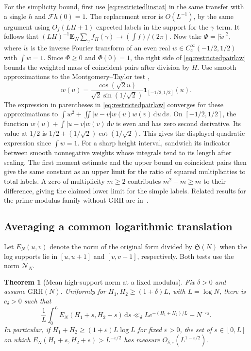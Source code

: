 \documentclass[11pt,a4paper]{article}
\numberwithin{equation}{section}
\newtheorem{theorem}{Theorem}[section]
\newcommand{\SSS}{\mathfrak S}
\newcommand{\grh}{\mathrm{GRH}}
\newcommand{\ud}{\mathrm d}
\newcommand{\NN}{\mathcal N_N}
\begin{document}
For the simplicity bound, first use \cref{eq:restrictedlinstat}
in the same transfer with a single $h$ and $\mathcal Fh(0)=1$.
The replacement error is $O(L^{-1})$, by the same argument
using $O_f(LH+1)$ expected labels in the support for the
$\gamma$ term. It follows that
$(LH)^{-1}\mathbf E_N\sum_\gamma f_H(\gamma)\to(\int f)/(2\pi)$.
Now take $\Phi=|\check w|^2$, where $\check w$ is the inverse
Fourier transform of an even real $w\in C_c^\infty(-1/2,1/2)$
with $\int w=1$. Since $\Phi\ge0$ and $\Phi(0)=1$, the right
side of \cref{eq:restrictedpairlaw} bounds the weighted mass
of coincident pairs after division by $H$. Use smooth
approximations to the Montgomery--Taylor test
\cite[Section~3.5]{CarneiroEtAl},
\[
 w(u)=\frac{\cos(\sqrt2 u)}{\sqrt2\sin(1/\sqrt2)}
           \mathbf1_{[-1/2,1/2]}(u).
\]
The expression in parentheses in \cref{eq:restrictedpairlaw}
converges for these approximations to
$\int w^2+\iint |u-v|w(u)w(v)\,\ud u\,\ud v$.
On $[-1/2,1/2]$, the function
$w(u)+\int |u-v|w(v)\,\ud v$ is even and has zero second
derivative. Its value at $1/2$ is
$1/2+(1/\sqrt2)\cot(1/\sqrt2)$. This gives the displayed
quadratic expression since $\int w=1$.
For a sharp height interval, sandwich its indicator between
smooth nonnegative weights whose integrals tend to its
length after scaling. The first moment estimate and the
upper bound on coincident pairs then give the same constant
as an upper limit for the ratio of squared multiplicities to
total labels. A zero of multiplicity $m\ge2$ contributes
$m^2-m\ge m$ to their difference, giving the claimed
lower limit for the simple labels. Related results for
the prime-modulus family without GRH are in~\cite{HuaYang}.

\subsection{Averaging a common logarithmic translation}

Let $E_N(u,v)$ denote the norm of the original form divided
by $\SSS(N)$ when the log supports lie in $[u,u+1]$ and
$[v,v+1]$, respectively. Both tests use the norm $\NN$.

\begin{theorem}[Mean high-support norm at a fixed modulus]
\label{thm:shiftmean}
Fix $\delta>0$ and assume $\grh(N)$. Uniformly for
$H_1,H_2\ge(1+\delta)L$, with $L=\log N$, there is $c_\delta>0$
such that
\begin{equation}
 \frac1L\int_0^L E_N(H_1+s,H_2+s)\,\ud s
     \ll_\delta L e^{-(H_1+H_2)/L}+N^{-c_\delta}.
 \label{eq:shiftmean}
\end{equation}
In particular, if $H_1+H_2\ge(1+\varepsilon)L\log L$
for fixed $\varepsilon>0$, the set of $s\in[0,L]$ on which
$E_N(H_1+s,H_2+s)>L^{-\varepsilon/2}$ has measure
$O_{\delta,\varepsilon}(L^{1-\varepsilon/2})$.
\end{theorem}
\end{document}
